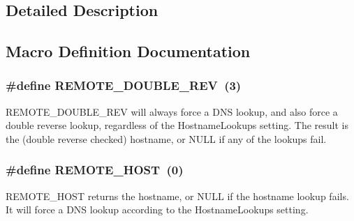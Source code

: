 \subsection{Detailed Description}


\subsection{Macro Definition Documentation}
\subsubsection[{\texorpdfstring{R\+E\+M\+O\+T\+E\+\_\+\+D\+O\+U\+B\+L\+E\+\_\+\+R\+EV}{REMOTE_DOUBLE_REV}}]{\setlength{\rightskip}{0pt plus 5cm}\#define R\+E\+M\+O\+T\+E\+\_\+\+D\+O\+U\+B\+L\+E\+\_\+\+R\+EV~(3)}\hypertarget{group__get__remote__host_ga56799bd18cc1727ea5247854ea7cd523}{}\label{group__get__remote__host_ga56799bd18cc1727ea5247854ea7cd523}
R\+E\+M\+O\+T\+E\+\_\+\+D\+O\+U\+B\+L\+E\+\_\+\+R\+EV will always force a D\+NS lookup, and also force a double reverse lookup, regardless of the Hostname\+Lookups setting. The result is the (double reverse checked) hostname, or N\+U\+LL if any of the lookups fail. 
\subsubsection[{\texorpdfstring{R\+E\+M\+O\+T\+E\+\_\+\+H\+O\+ST}{REMOTE_HOST}}]{\setlength{\rightskip}{0pt plus 5cm}\#define R\+E\+M\+O\+T\+E\+\_\+\+H\+O\+ST~(0)}\hypertarget{group__get__remote__host_ga4dddc39b16889bfb467fdbeaf5e8ea2f}{}\label{group__get__remote__host_ga4dddc39b16889bfb467fdbeaf5e8ea2f}
R\+E\+M\+O\+T\+E\+\_\+\+H\+O\+ST returns the hostname, or N\+U\+LL if the hostname lookup fails. It will force a D\+NS lookup according to the Hostname\+Lookups setting. 
